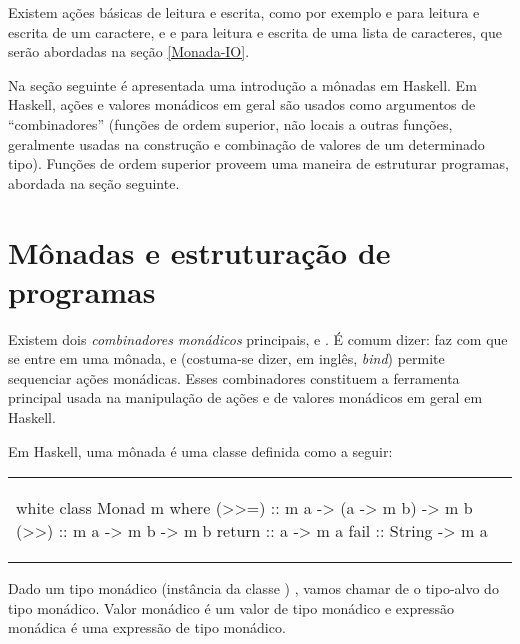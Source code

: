 Existem ações básicas de leitura e escrita, como por exemplo
 e  para leitura e escrita de um caractere,
e  e  para leitura e escrita de uma lista de
caracteres, que serão abordadas na seção \ref{Monada-IO}.

Na seção seguinte é apresentada uma introdução a mônadas em Haskell.
Em Haskell, ações e valores monádicos em geral são usados como
argumentos de ``combinadores'' (funções de ordem superior, não locais
a outras funções, geralmente usadas na construção e combinação de
valores de um determinado tipo). Funções de ordem superior proveem uma
maneira de estruturar programas, abordada na seção seguinte.

\section{Mônadas e estruturação de programas}
\label{Monadas-e-estruturacao-de-programas}

Existem dois {\em combinadores monádicos\/} principais,  e
\ina{>>=}. É comum dizer:  faz com que se entre em uma
mônada, e \ina{>>=} (costuma-se dizer, em inglês, {\em bind\/})
permite sequenciar ações monádicas. Esses combinadores constituem a
ferramenta principal usada na manipulação de ações e de valores
monádicos em geral em Haskell.



Em Haskell, uma mônada é uma classe definida como a seguir:

\begin{center}
\begin{tabular}{l}
\begin{alg}{.5\textwidth}{white}
class Monad m where
  (>>=) :: m a -> (a -> m b) -> m b
  (>>) :: m a -> m b -> m b
  return :: a -> m a
  fail :: String -> m a
\end{alg}
\end{tabular}
\end{center}

Dado um tipo monádico (instância da classe ) ,
vamos chamar de  o tipo-alvo do tipo monádico. Valor monádico é
um valor de tipo monádico e expressão monádica é uma expressão de tipo
monádico.

